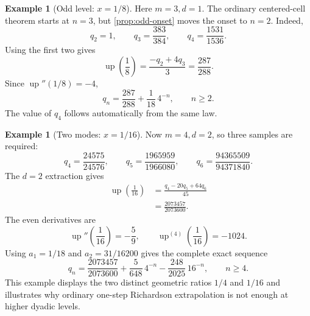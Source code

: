 \documentclass[11pt,oneside]{article}
\theoremstyle{definition}
\newtheorem{example}[theorem]{Example}
\theoremstyle{remark}
\newcommand{\up}{\operatorname{up}}
\begin{document}
\begin{example}[Odd level: \(x=1/8\)]\label{ex:eighth}
Here \(m=3,d=1\).  The ordinary centered-cell theorem starts at \(n=3\), but
\cref{prop:odd-onset} moves the onset to \(n=2\).  Indeed,
\begin{equation}\label{eq:eighth-samples}
 q_2=1,
 \qquad q_3=\frac{383}{384},
 \qquad q_4=\frac{1531}{1536}.
\end{equation}
Using the first two gives
\begin{equation}\label{eq:eighth-value}
 \up\!\left(\frac18\right)
 =\frac{-q_2+4q_3}{3}
 =\frac{287}{288}.
\end{equation}
Since \(\up''(1/8)=-4\),
\begin{equation}\label{eq:eighth-law}
 \boxed{\displaystyle
 q_n=\frac{287}{288}+\frac1{18}\,4^{-n},\qquad n\ge2.}
\end{equation}
The value of \(q_4\) follows automatically from the same law.
\end{example}

\begin{example}[Two modes: \(x=1/16\)]\label{ex:sixteenth}
Now \(m=4,d=2\), so three samples are required:
\begin{equation}\label{eq:sixteenth-samples}
 q_4=\frac{24575}{24576},\qquad
 q_5=\frac{1965959}{1966080},\qquad
 q_6=\frac{94365509}{94371840}.
\end{equation}
The \(d=2\) extraction gives
\begin{equation}\label{eq:sixteenth-value}
 \begin{aligned}
 \up\!\left(\frac1{16}\right)
 &=\frac{q_4-20q_5+64q_6}{45}\\
 &=\frac{2073457}{2073600}.
 \end{aligned}
\end{equation}
The even derivatives are
\begin{equation}\label{eq:sixteenth-derivatives}
 \up''\!\left(\frac1{16}\right)=-\frac59,
 \qquad
 \up^{(4)}\!\left(\frac1{16}\right)=-1024.
\end{equation}
Using \(a_1=1/18\) and \(a_2=31/16200\) gives the complete exact sequence
\begin{equation}\label{eq:sixteenth-law}
 \boxed{\displaystyle
 q_n=\frac{2073457}{2073600}
 +\frac5{648}\,4^{-n}
 -\frac{248}{2025}\,16^{-n},
 \qquad n\ge4.}
\end{equation}
This example displays the two distinct geometric ratios \(1/4\) and \(1/16\)
and illustrates why ordinary one-step Richardson extrapolation is not enough
at higher dyadic levels.
\end{example}
\end{document}
